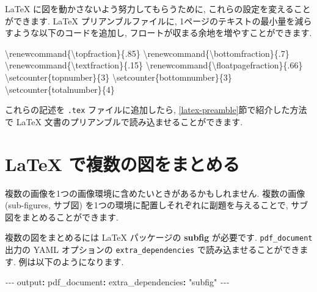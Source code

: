 \documentclass[
  11pt,
  lualatex,
  ja=standard]{bxjsreport}
\newenvironment{Shaded}{\begin{snugshade}}{\end{snugshade}}
\newcommand{\AttributeTok}[1]{\textcolor[rgb]{0.77,0.63,0.00}{#1}}
\newcommand{\ExtensionTok}[1]{#1}
\newcommand{\FunctionTok}[1]{\textcolor[rgb]{0.00,0.00,0.00}{#1}}
\newcommand{\KeywordTok}[1]{\textcolor[rgb]{0.13,0.29,0.53}{\textbf{#1}}}
\newcommand{\NormalTok}[1]{#1}
\newcommand{\PreprocessorTok}[1]{\textcolor[rgb]{0.56,0.35,0.01}{\textit{#1}}}
\newcommand{\StringTok}[1]{\textcolor[rgb]{0.31,0.60,0.02}{#1}}
\begin{document}
LaTeX に図を動かさないよう努力してもらうために, これらの設定を変えることができます. LaTeX プリアンブルファイルに, 1ページのテキストの最小量を減らすような以下のコードを追加し, フロートが収まる余地を増やすことができます.

\begin{Shaded}
\begin{Highlighting}[]
\FunctionTok{\textbackslash{}renewcommand}\NormalTok{\{}\ExtensionTok{\textbackslash{}topfraction}\NormalTok{\}\{.85\}}
\FunctionTok{\textbackslash{}renewcommand}\NormalTok{\{}\ExtensionTok{\textbackslash{}bottomfraction}\NormalTok{\}\{.7\}}
\FunctionTok{\textbackslash{}renewcommand}\NormalTok{\{}\ExtensionTok{\textbackslash{}textfraction}\NormalTok{\}\{.15\}}
\FunctionTok{\textbackslash{}renewcommand}\NormalTok{\{}\ExtensionTok{\textbackslash{}floatpagefraction}\NormalTok{\}\{.66\}}
\FunctionTok{\textbackslash{}setcounter}\NormalTok{\{topnumber\}\{3\}}
\FunctionTok{\textbackslash{}setcounter}\NormalTok{\{bottomnumber\}\{3\}}
\FunctionTok{\textbackslash{}setcounter}\NormalTok{\{totalnumber\}\{4\}}
\end{Highlighting}
\end{Shaded}

これらの記述を \texttt{.tex} ファイルに追加したら, \ref{latex-preamble}節で紹介した方法で LaTeX 文書のプリアンブルで読み込ませることができます.

\hypertarget{latex-subfigure}{%
\section{LaTeX で複数の図をまとめる}\label{latex-subfigure}}

複数の画像を1つの画像環境に含めたいときがあるかもしれません. 複数の画像 (sub-figures, サブ図) を1つの環境に配置しそれぞれに副題を与えることで, サブ図をまとめることができます.

複数の図をまとめるには LaTeX パッケージの \textbf{subfig} が必要です. \texttt{pdf\_document} 出力の YAML オプションの \texttt{extra\_dependencies} で読み込ませることができます. 例は以下のようになります.

\begin{Shaded}
\begin{Highlighting}[]
\PreprocessorTok{{-}{-}{-}}
\FunctionTok{output}\KeywordTok{:}
\AttributeTok{  }\FunctionTok{pdf\_document}\KeywordTok{:}
\AttributeTok{    }\FunctionTok{extra\_dependencies}\KeywordTok{:}\AttributeTok{ }\StringTok{"subfig"}
\PreprocessorTok{{-}{-}{-}}
\end{Highlighting}
\end{Shaded}
\end{document}
